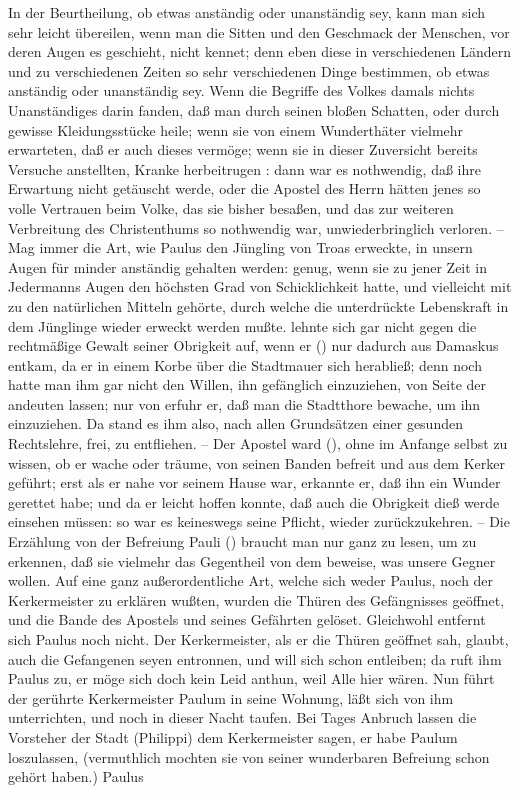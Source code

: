 \begin{aufza}
\item[\RWbet{Antwort.}] In der Beurtheilung, ob etwas anständig oder unanständig sey, kann man sich sehr leicht übereilen, wenn man die Sitten und den Geschmack der Menschen, vor deren Augen es geschieht, nicht kennet; denn eben diese in verschiedenen Ländern und zu verschiedenen Zeiten so sehr verschiedenen Dinge bestimmen, ob etwas anständig oder unanständig sey. Wenn die Begriffe des Volkes damals nichts Unanständiges darin fanden, daß man durch seinen bloßen Schatten, oder durch gewisse Kleidungsstücke heile; wenn sie von einem Wunderthäter vielmehr erwarteten, daß er auch dieses vermöge; wenn sie in dieser Zuversicht bereits Versuche anstellten, Kranke herbeitrugen \usw : dann war es nothwendig, daß ihre Erwartung nicht getäuscht werde, oder die Apostel des Herrn hätten jenes so volle Vertrauen beim Volke, das sie bisher besaßen, und das zur weiteren Verbreitung des Christenthums so nothwendig war, unwiederbringlich verloren. -- Mag immer die Art, wie Paulus den Jüngling von Troas erweckte, in unsern Augen für minder anständig gehalten werden: genug, wenn sie zu jener Zeit in Jedermanns Augen den höchsten Grad von Schicklichkeit hatte, und vielleicht mit zu den natürlichen Mitteln gehörte, durch welche die unterdrückte Lebenskraft in dem Jünglinge wieder erweckt werden mußte.  lehnte sich gar nicht gegen die rechtmäßige Gewalt seiner Obrigkeit auf, wenn er () nur dadurch aus Damaskus entkam, da er in einem Korbe über die Stadtmauer sich herabließ; denn noch hatte man ihm gar nicht den Willen, ihn gefänglich einzuziehen, von Seite der  andeuten lassen; nur von  erfuhr er, daß man die Stadtthore bewache, um ihn einzuziehen. Da stand es ihm also, nach allen Grundsätzen einer gesunden Rechtslehre, frei, zu entfliehen. -- Der Apostel  ward (), ohne im Anfange selbst zu wissen, ob er wache oder träume, von seinen Banden befreit und aus dem Kerker geführt; erst als er nahe vor seinem Hause war, erkannte er, daß ihn ein Wunder gerettet habe; und da er leicht hoffen konnte, daß auch die Obrigkeit dieß werde einsehen müssen: so war es keineswegs seine Pflicht, wieder zurückzukehren. -- Die Erzählung von der Befreiung Pauli () braucht man nur ganz zu lesen, um zu erkennen, daß sie vielmehr das Gegentheil von dem beweise, was unsere Gegner wollen. Auf eine ganz außerordentliche Art, welche sich weder Paulus, noch der Kerkermeister zu erklären wußten, wurden die Thüren des Gefängnisses geöffnet, und die Bande des Apostels und seines Gefährten  gelöset. Gleichwohl entfernt sich Paulus noch nicht. Der Kerkermeister, als er die Thüren geöffnet sah, glaubt, auch die Gefangenen seyen entronnen, und will sich schon entleiben; da ruft ihm Paulus zu, er möge sich doch kein Leid anthun, weil Alle hier wären. Nun führt der gerührte Kerkermeister Paulum in seine Wohnung, läßt sich von ihm unterrichten, und noch in dieser Nacht taufen. Bei Tages Anbruch lassen die Vorsteher der Stadt (Philippi) dem Kerkermeister sagen, er habe Paulum loszulassen, (vermuthlich mochten sie von seiner wunderbaren Befreiung schon gehört haben.) Paulus 
\end{aufza}
